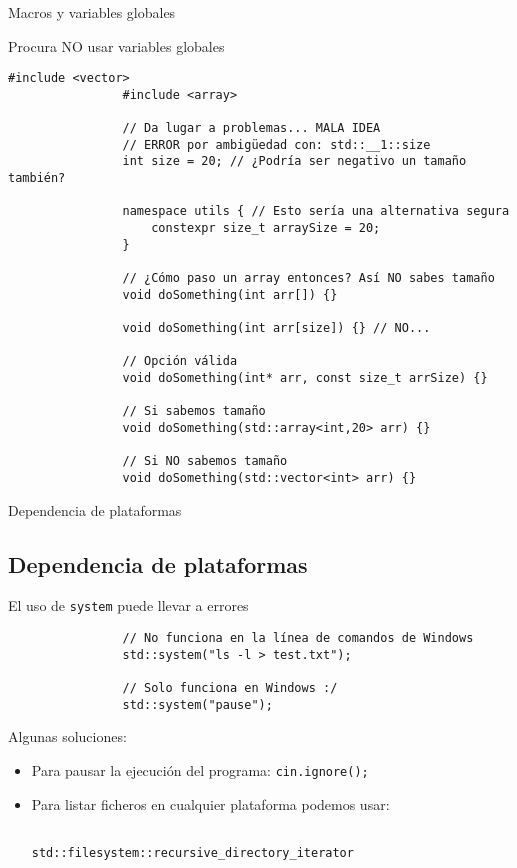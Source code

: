 \documentclass{beamer}
\newcommand{\normalSizeItem}[1] {
  \normalsize{\item #1}
}
\begin{document}
		\begin{frame}[fragile]{Macros y variables globales}	
			\begin{itemize}
			
				\normalSizeItem{Procura NO usar variables globales}
				\begin{lstlisting}[basicstyle={\tiny\ttfamily}]
				#include <vector>
				#include <array>
				
				// Da lugar a problemas... MALA IDEA
				// ERROR por ambigüedad con: std::__1::size
				int size = 20; // ¿Podría ser negativo un tamaño también?
				
				namespace utils { // Esto sería una alternativa segura
					constexpr size_t arraySize = 20;
				}
				
				// ¿Cómo paso un array entonces? Así NO sabes tamaño
				void doSomething(int arr[]) {}
				
				void doSomething(int arr[size]) {} // NO...
				
				// Opción válida
				void doSomething(int* arr, const size_t arrSize) {}
				
				// Si sabemos tamaño
				void doSomething(std::array<int,20> arr) {}
				
				// Si NO sabemos tamaño
				void doSomething(std::vector<int> arr) {}
				\end{lstlisting}
				
			\end{itemize}
		\end{frame}
		
		\begin{frame}[fragile]{Dependencia de plataformas}	
			\subsection{Dependencia de plataformas}		
			\begin{itemize}

				\normalSizeItem { El uso de \texttt{system} puede llevar a errores}
				\begin{lstlisting}
				// No funciona en la línea de comandos de Windows
				std::system("ls -l > test.txt");
				
				// Solo funciona en Windows :/
				std::system("pause"); 
				\end{lstlisting}
				
				\item { 
					
					Algunas soluciones: 
								
					\begin{itemize}
						\item {
							Para pausar la ejecución del programa: \texttt{cin.ignore();}
						}
						\item {
							Para listar ficheros en cualquier plataforma podemos usar:
							 \begin{verbatim}
							 	std::filesystem::recursive_directory_iterator
							 \end{verbatim}
						}					
					\end{itemize}
				}
			\end{itemize}
		\end{frame}
		
\end{document}

